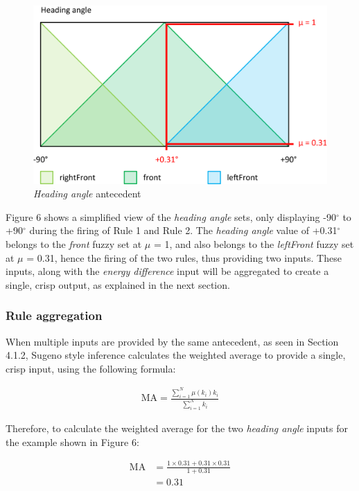 \begin{figure}[H]
\centering
\caption{\emph{Heading angle} antecedent}
\includegraphics[scale=0.1]{./img/pdf/turnRule_headingAngle.pdf}
\end{figure}

Figure 6 shows a simplified view of the \emph{heading angle} sets, only displaying -90$^{\circ}$ to +90$^{\circ}$ during the firing of Rule 1 and Rule 2. The \emph{heading angle} value of +0.31$^{\circ}$ belongs to the \emph{front} fuzzy set at $\mu$ = 1, and also belongs to the \emph{leftFront} fuzzy set at $\mu$ = 0.31, hence the firing of the two rules, thus providing two inputs. These inputs, along with the \emph{energy difference} input will be aggregated to create a single, crisp output, as explained in the next section.

\subsubsection{Rule aggregation}

When multiple inputs are provided by the same antecedent, as seen in Section 4.1.2, Sugeno style inference calculates the weighted average to provide a single, crisp input, using the following formula:

{\LARGE
	\begin{align}
	\mbox{MA} = \frac{\sum^N_{i=1} \mu(k_i) k_i}{\sum^N_{i=1} k_i}
	\end{align}
}

\noindent
Therefore, to calculate the weighted average for the two \emph{heading angle} inputs for the example shown in Figure 6:

{\LARGE
	\begin{align}
	\mbox{MA} &= \frac{1 \times 0.31 + 0.31 \times 0.31}{1 + 0.31} \\
	&= 0.31
	\end{align}
}

